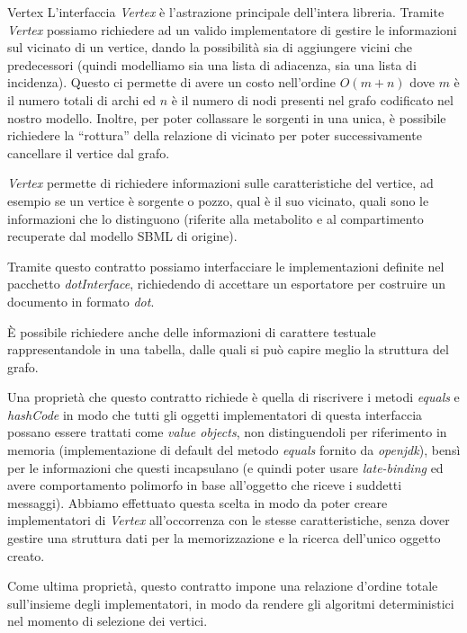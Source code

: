 \begin{paragraph}{Vertex}
  L'interfaccia \emph{Vertex} \`e l'astrazione principale dell'intera
  libreria.  Tramite \emph{Vertex} possiamo richiedere ad un valido
  implementatore di gestire le informazioni sul vicinato di un
  vertice, dando la possibilit\`a sia di aggiungere vicini che
  predecessori (quindi modelliamo sia una lista di adiacenza, sia una
  lista di incidenza). Questo ci permette di avere un costo
  nell'ordine $O(m + n)$ dove $m$ \`e il numero totali di archi ed $n$
  \`e il numero di nodi presenti nel grafo codificato nel nostro
  modello. Inoltre, per poter collassare le sorgenti in una unica, \`e
  possibile richiedere la ``rottura'' della relazione di vicinato per
  poter successivamente cancellare il vertice dal grafo.

  \emph{Vertex} permette di richiedere informazioni sulle
  caratteristiche del vertice, ad esempio se un vertice \`e sorgente o
  pozzo, qual \`e il suo vicinato, quali sono le informazioni che lo
  distinguono (riferite alla metabolito e al compartimento recuperate
  dal modello SBML di origine).

  Tramite questo contratto possiamo interfacciare le implementazioni
  definite nel pacchetto \emph{dotInterface}, richiedendo di accettare
  un esportatore per costruire un documento in formato \emph{dot}.

  \`E possibile richiedere anche delle informazioni di carattere
  testuale rappresentandole in una tabella, dalle quali si pu\`o
  capire meglio la struttura del grafo.

  Una propriet\`a che questo contratto richiede \`e quella di
  riscrivere i metodi \emph{equals} e \emph{hashCode} in modo che
  tutti gli oggetti implementatori di questa interfaccia possano
  essere trattati come \emph{value objects}, non distinguendoli per
  riferimento in memoria (implementazione di default del metodo
  \emph{equals} fornito da \emph{openjdk}), bens\`i per le
  informazioni che questi incapsulano (e quindi poter usare
  \emph{late-binding} ed avere comportamento polimorfo in base
  all'oggetto che riceve i suddetti messaggi). Abbiamo effettuato
  questa scelta in modo da poter creare implementatori di
  \emph{Vertex} all'occorrenza con le stesse caratteristiche, senza
  dover gestire una struttura dati per la memorizzazione e la ricerca
  dell'unico oggetto creato.

  Come ultima propriet\`a, questo contratto impone una relazione
  d'ordine totale sull'insieme degli implementatori, in modo da
  rendere gli algoritmi deterministici nel momento di selezione dei
  vertici.
\end{paragraph}

